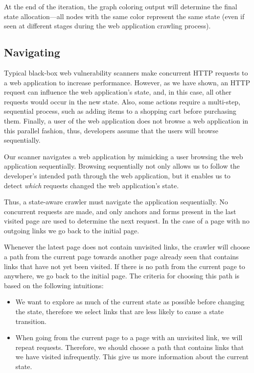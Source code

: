 At the end of the iteration, the graph coloring output will determine the final
state allocation---all nodes with the same color represent the same state (even
if seen at different stages during the web application crawling process).

\subsection{Navigating}

Typical black-box web vulnerability scanners make concurrent HTTP requests to a
web application to increase performance. However, as we have shown, an HTTP
request can influence the web application's state, and, in this case, all other
requests would occur in the new state. Also, some actions require a multi-step,
sequential process, such as adding items to a shopping cart before purchasing
them. Finally, a user of the web application does not browse a web application
in this parallel fashion, thus, developers assume that the users will browse
sequentially.

Our scanner navigates a web application by mimicking a user browsing the web
application sequentially. Browsing sequentially not only allows us to follow
the developer's intended path through the web application, but it enables us to
detect \emph{which} requests changed the web application's state.

Thus, a state-aware crawler must navigate the application sequentially. No
concurrent requests are made, and only anchors and forms present in the last
visited page are used to determine the next request. In the case of a page
with no outgoing links we go back to the initial page.

Whenever the latest page does not contain unvisited links, the crawler will
choose a path from the current page towards another page already seen that
contains links that have not yet been visited. If there is no path from the
current page to anywhere, we go back to the initial page. The criteria for choosing this
path is based on the following intuitions:
\begin{itemize}
 \item We want to explore as much of the current state as possible before
   changing the state, therefore we select links that are less likely to cause
   a state transition.
 \item When going from the current page to a page with an unvisited link, we
   will repeat requests. Therefore, we should choose a path that contains links
   that we have visited infrequently. This give us more information about the
   current state. 
\end{itemize}

